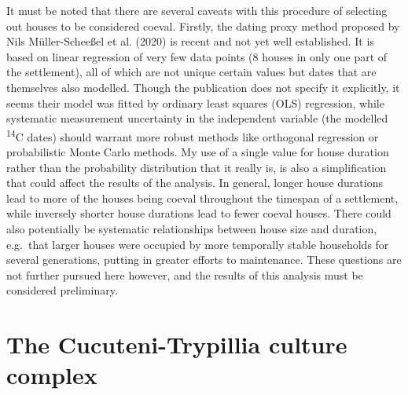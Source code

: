 \documentclass[
  12pt,
  a4paper, twoside]{book}
\begin{document}
It must be noted that there are several caveats with this procedure of selecting out houses to be considered coeval. Firstly, the dating proxy method proposed by Nils Müller-Scheeßel et al. (2020) is recent and not yet well established. It is based on linear regression of very few data points (8 houses in only one part of the settlement), all of which are not unique certain values but dates that are themselves also modelled. Though the publication does not specify it explicitly, it seems their model was fitted by ordinary least squares (OLS) regression, while systematic measurement uncertainty in the independent variable (the modelled \textsuperscript{14}C dates) should warrant more robust methods like orthogonal regression or probabilistic Monte Carlo methods. My use of a single value for house duration rather than the probability distribution that it really is, is also a simplification that could affect the results of the analysis. In general, longer house durations lead to more of the houses being coeval throughout the timespan of a settlement, while inversely shorter house durations lead to fewer coeval houses. There could also potentially be systematic relationships between house size and duration, e.g.~that larger houses were occupied by more temporally stable households for several generations, putting in greater efforts to maintenance. These questions are not further pursued here however, and the results of this analysis must be considered preliminary.

\hypertarget{trypillia}{%
\section{The Cucuteni-Trypillia culture complex}\label{trypillia}}
\end{document}

